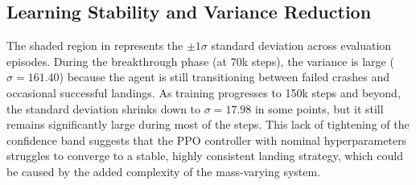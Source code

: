 \subsection{Learning Stability and Variance Reduction}
The shaded region in  represents the $\pm 1\sigma$ standard deviation across evaluation episodes. During the breakthrough phase (at 70k steps), the variance is large ($\sigma = 161.40$) because the agent is still transitioning between failed crashes and occasional successful landings. As training progresses to 150k steps and beyond, the standard deviation shrinks down to $\sigma = 17.98$ in some points, but it still remains significantly large during most of the steps. This lack of tightening of the confidence band suggests that the PPO controller with nominal hyperparameters struggles to converge to a stable, highly consistent landing strategy, which could be caused by the added complexity of the mass-varying system.
